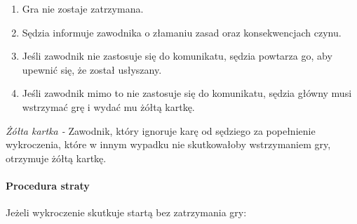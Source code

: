 \documentclass[12pt]{article}
\begin{document}
\begin{enumerate}
\item
    Gra nie zostaje zatrzymana.
  \item
    Sędzia informuje zawodnika o złamaniu zasad oraz konsekwencjach czynu.
  \item
    Jeśli zawodnik nie zastosuje się do komunikatu, sędzia powtarza go,
  aby upewnić się, że został usłyszany.
  \item
    Jeśli zawodnik mimo to nie zastosuje się do komunikatu, sędzia główny
  musi wstrzymać grę i wydać mu żółtą kartkę.
  \end{enumerate}

\emph{Żółta kartka -} Zawodnik, który ignoruje karę od sędziego za
popełnienie wykroczenia, które w innym wypadku nie skutkowałoby
wstrzymaniem gry, otrzymuje żółtą kartkę.

\paragraph{Procedura straty}
Jeżeli wykroczenie skutkuje startą
bez zatrzymania gry:
\end{document}
